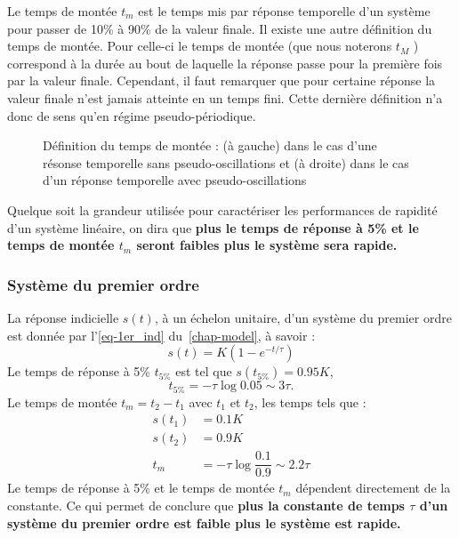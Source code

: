 Le temps de montée $t_m$ est le temps mis par réponse temporelle d'un système 
pour passer de 10\% à 90\% de la valeur finale. Il existe une autre 
définition du temps de montée. Pour celle-ci le temps de montée (que nous 
noterons $t_{M}$ ) correspond à la durée au bout de laquelle la 
réponse passe pour la première fois par la valeur finale. Cependant, 
il faut remarquer que pour certaine réponse la valeur finale n'est 
jamais atteinte en un temps fini. Cette dernière définition
n'a donc de sens qu'en régime pseudo-périodique.
\begin{figure}[!h]
    \centering
    
    
    \caption{Définition du temps de montée : (à gauche) dans le cas
             d'une résonse temporelle sans pseudo-oscillations et (à droite) 
             dans le cas d'un réponse temporelle avec pseudo-oscillations}
\end{figure}
Quelque soit la grandeur utilisée pour caractériser les performances de rapidité
d'un système linéaire, on dira que \textbf{plus le temps de réponse à 5\% et le
temps de montée $t_m$ seront faibles plus le système sera rapide.}
\subsubsection{Système du premier ordre}
La réponse indicielle $s(t)$, à un échelon unitaire, 
d'un système du premier ordre est donnée par l'\cref{eq-1er_ind} 
du~\cref{chap-model}, à savoir :
\[
s(t)=K\left(1-e^{-t/\tau}\right)
\]
Le temps de réponse à 5\% $t_{5\%}$ est tel que $s(t_{5\%})=0.95K$, 
\[
t_{5\%}=-\tau\log{0.05}\sim3\tau.
\]
Le temps de montée $t_m=t_2-t_1$ avec $t_1$ et $t_2$, les temps tels que :
\begin{align*}
    s(t_1)&=0.1K\\
    s(t_2)&=0.9K\\
    t_m   &=-\tau\log{\dfrac{0.1}{0.9}}\sim2.2\tau
\end{align*}
Le temps de réponse à 5\% et le temps de montée $t_m$ dépendent 
directement de la constante. Ce qui permet de conclure que 
\textbf{plus la constante de temps $\tau$ d'un système du premier
ordre est faible plus le système est rapide.}

